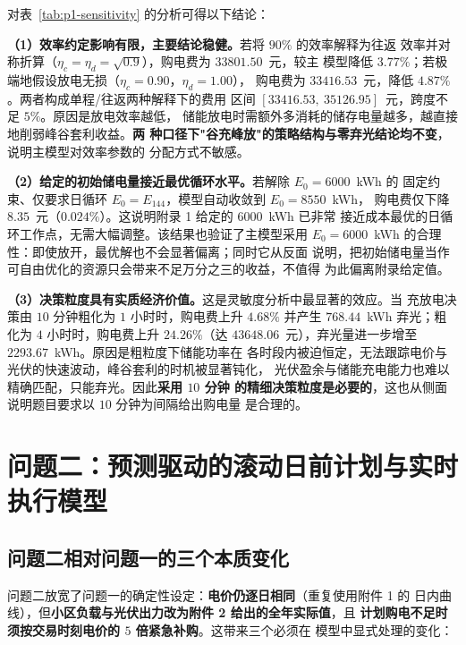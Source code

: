 \documentclass[withoutpreface,bwprint]{cumcmthesis}
\begin{document}
对表~\ref{tab:p1-sensitivity} 的分析可得以下结论：

\textbf{（1）效率约定影响有限，主要结论稳健。}若将 $90\%$ 的效率解释为往返
效率并对称折算（$\eta_c=\eta_d=\sqrt{0.9}$），购电费为 $33801.50$~元，较主
模型降低 $3.77\%$；若极端地假设放电无损（$\eta_c=0.90$，$\eta_d=1.00$），
购电费为 $33416.53$~元，降低 $4.87\%$。两者构成单程/往返两种解释下的费用
区间 $[33416.53,\ 35126.95]$~元，跨度不足 $5\%$。原因是放电效率越低，
储能放电时需额外多消耗的储存电量越多，越直接地削弱峰谷套利收益。\textbf{两
种口径下"谷充峰放"的策略结构与零弃光结论均不变}，说明主模型对效率参数的
分配方式不敏感。

\textbf{（2）给定的初始储电量接近最优循环水平。}若解除 $E_0 = 6000$~kWh 的
固定约束、仅要求日循环 $E_0 = E_{144}$，模型自动收敛到 $E_0 = 8550$~kWh，
购电费仅下降 $8.35$~元（$0.024\%$）。这说明附录 1 给定的 $6000$~kWh 已非常
接近成本最优的日循环工作点，无需大幅调整。该结果也验证了主模型采用
$E_0 = 6000$~kWh 的合理性：即使放开，最优解也不会显著偏离；同时它从反面
说明，把初始储电量当作可自由优化的资源只会带来不足万分之三的收益，不值得
为此偏离附录给定值。

\textbf{（3）决策粒度具有实质经济价值。}这是灵敏度分析中最显著的效应。当
充放电决策由 $10$ 分钟粗化为 $1$ 小时时，购电费上升 $4.68\%$ 并产生
$768.44$~kWh 弃光；粗化为 $4$ 小时时，购电费上升 $24.26\%$（达
$43648.06$~元），弃光量进一步增至 $2293.67$~kWh。原因是粗粒度下储能功率在
各时段内被迫恒定，无法跟踪电价与光伏的快速波动，峰谷套利的时机被显著钝化，
光伏盈余与储能充电能力也难以精确匹配，只能弃光。因此\textbf{采用 $10$ 分钟
的精细决策粒度是必要的}，这也从侧面说明题目要求以 $10$ 分钟为间隔给出购电量
是合理的。

\section{问题二：预测驱动的滚动日前计划与实时执行模型}

\subsection{问题二相对问题一的三个本质变化}

问题二放宽了问题一的确定性设定：\textbf{电价仍逐日相同}（重复使用附件 1 的
日内曲线），但\textbf{小区负载与光伏出力改为附件 2 给出的全年实际值}，且
\textbf{计划购电不足时须按交易时刻电价的 $5$ 倍紧急补购}。这带来三个必须在
模型中显式处理的变化：
\end{document}
